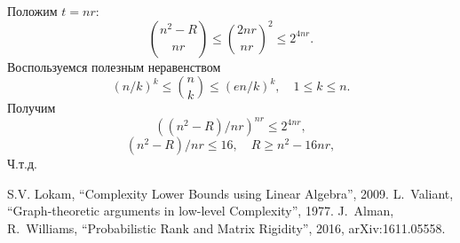 \documentclass[handout]{beamer}
\renewcommand\le{\leqslant}
\renewcommand\ge{\geqslant}
\begin{document}
\begin{frame}
    Положим $t=nr$:
    $$
    \binom{n^2-R}{nr} \le \binom{2nr}{nr}^2 \le 2^{4nr}.
    $$
    \pause
    Воспользуемся полезным неравенством
    $$
    (n/k)^k \le \binom{n}{k} \le (en/k)^k,\quad 1\le k\le n.
    $$
    Получим
    $$
    ((n^2-R)/nr)^{nr} \le 2^{4nr},
    $$
    $$
    (n^2-R)/nr \le 16,\quad R \ge n^2-16nr,
    $$
    Ч.т.д.
\end{frame}


\begin{frame}

    \begin{thebibliography}{XXXX}
         S.V. Lokam, ``Complexity Lower Bounds using Linear Algebra'',
            2009.
         L.~Valiant, ``Graph-theoretic arguments in low-level
            Complexity'', 1977.
         J.~Alman, R.~Williams, ``Probabilistic Rank and Matrix
                Rigidity'', 2016, arXiv:1611.05558.
    \end{thebibliography}


\end{frame}
\end{document}
